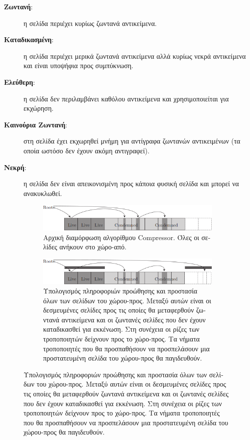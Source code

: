 \begin{greek}
\begin{description}
  \item[\textbf{Ζωντανή}:] η σελίδα περιέχει κυρίως ζωντανά
        αντικείμενα. 
  \item[\textbf{Καταδικασμένη}:] η σελίδα περιέχει μερικά
        ζωντανά αντικείμενα αλλά κυρίως νεκρά αντικείμενα και είναι
        υποψήφια προς συμπύκνωση.
  \item[\textbf{Ελεύθερη}:] η σελίδα δεν περιλαμβάνει καθόλου
        αντικείμενα και χρησιμοποιείται για εκχώρηση.
  \item[\textbf{Καινούρια Ζωντανή}:] στη σελίδα έχει εκχωρηθεί
       μνήμη για αντίγραφα ζωντανών αντικειμένων (τα οποία
       ωστόσο δεν έχουν ακόμη αντιγραφεί).
  \item[\textbf{Νεκρή}:] η σελίδα δεν είναι απεικονισμένη προς
        κάποια φυσική σελίδα και μπορεί να ανακυκλωθεί.
\end{description}

\begin{figure}
  \centering
  \begin{subfigure}{1.0\textwidth}
    \includegraphics{figures/conc_2a}
    \caption
      {Αρχική διαμόρφωση αλγορίθμου Compressor. Όλες οι
       σελίδες ανήκουν στο χώρο-από.}
  \end{subfigure}

  \begin{subfigure}[b]{1.0\textwidth}
    \includegraphics{figures/conc_2b}
    \caption
      {Υπολογισμός πληροφοριών προώθησης και προστασία όλων
       των σελίδων του χώρου-προς. Μεταξύ αυτών είναι οι
       δεσμευμένες σελίδες προς τις οποίες θα μεταφερθούν
       ζωντανά αντικείμενα και οι ζωντανές σελίδες που δεν
       έχουν καταδικασθεί για εκκένωση. Στη συνέχεια οι ρίζες
       των τροποποιητών δείχνουν προς το χώρο-προς. Τα νήματα
       τροποποιητές που θα προσπαθήσουν να προσπελάσουν μια
       προστατευμένη σελίδα του χώρου-προς θα παγιδευθούν.}
  \end{subfigure}
  

\end{figure}
\end{greek}
